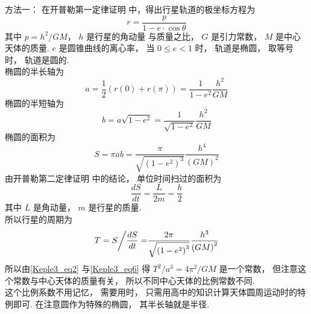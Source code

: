 方法一：
在开普勒第一定律证明%
中，得出行星轨道的极坐标方程为
\begin{equation}\label{Keple3_eq1}
  r = \frac{p}{{1 - e \cdot \cos \theta }}
\end{equation}
其中 $p = {{{h^2}}}/{{GM}}$，  $h$ 是行星的角动量%
与质量之比， $G$ 是引力常数， $M$ 是中心天体的质量. $e$ 是圆锥曲线的离心率， 当 $0 \le e < 1$ 时， 轨道是椭圆， 取等号时， 轨道是圆的. \\
椭圆的半长轴为
\begin{equation}\label{Keple3_eq2}
  a = \frac{1}{2}\left( {r\left( 0 \right) + r\left( \pi  \right)} \right) = \frac{1}{{1 - {e^2}}}\frac{{{h^2}}}{{GM}}
\end{equation}
椭圆的半短轴为
\begin{equation}\label{Keple3_eq3}
  b = a\sqrt {1 - {e^2}}  = \frac{1}{{\sqrt {1 - {e^2}} }}\frac{{{h^2}}}{{GM}}
\end{equation}
椭圆的面积为
\begin{equation}\label{Keple3_eq4}
  S = \pi ab = \frac{\pi }{{\sqrt {{{\left( {1 - {e^2}} \right)}^3}} }}\frac{{{h^4}}}{{{{\left( {GM} \right)}^2}}}
\end{equation}
由开普勒第二定律证明%
中的结论， 单位时间扫过的面积为
\begin{equation}\label{Keple3_eq5}
  \frac{{dS}}{{dt}} = \frac{L}{{2m}} = \frac{h}{2}
\end{equation}
其中 $L$ 是角动量， $m$ 是行星的质量.\\
所以行星的周期为
\begin{equation}\label{Keple3_eq6}
  T = {S \mathord{\left/
 {\vphantom {S {\frac{{dS}}{{dt}} = }}} \right.
 \kern-\nulldelimiterspace} {\frac{{dS}}{{dt}} = }}\frac{{2\pi }}{{\sqrt {{{\left( {1 - {e^2}} \right)}^3}} }}\frac{{{h^3}}}{{{{\left( {GM} \right)}^2}}}
\end{equation}
所以由\autoref{Keple3_eq2} 与\autoref{Keple3_eq6} 得 ${{{T^2}}}/{{{a^3}}} = {{4{\pi ^2}}}/{{GM}}$ 是一个常数， 但注意这个常数与中心天体的质量有关， 所以不同中心天体的比例常数不同. \\
这个比例系数不用记忆， 需要用时， 只需用高中的知识计算天体圆周运动时的特例即可. 在注意圆作为特殊的椭圆， 其半长轴就是半径.\\
